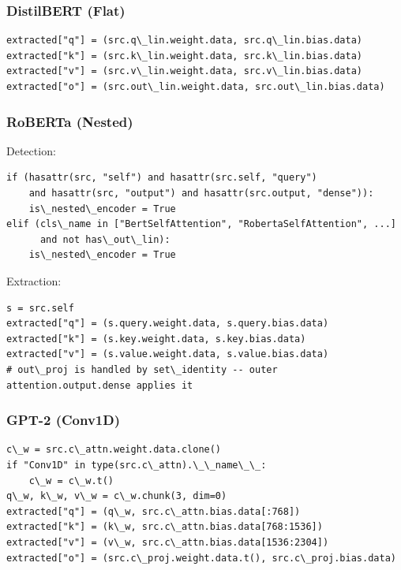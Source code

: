 \subsubsection{DistilBERT (Flat)}

\begin{lstlisting}
extracted["q"] = (src.q\_lin.weight.data, src.q\_lin.bias.data)
extracted["k"] = (src.k\_lin.weight.data, src.k\_lin.bias.data)
extracted["v"] = (src.v\_lin.weight.data, src.v\_lin.bias.data)
extracted["o"] = (src.out\_lin.weight.data, src.out\_lin.bias.data)
\end{lstlisting}

\subsubsection{RoBERTa (Nested)}

Detection:

\begin{lstlisting}
if (hasattr(src, "self") and hasattr(src.self, "query")
    and hasattr(src, "output") and hasattr(src.output, "dense")):
    is\_nested\_encoder = True
elif (cls\_name in ["BertSelfAttention", "RobertaSelfAttention", ...]
      and not has\_out\_lin):
    is\_nested\_encoder = True
\end{lstlisting}

Extraction:

\begin{lstlisting}
s = src.self
extracted["q"] = (s.query.weight.data, s.query.bias.data)
extracted["k"] = (s.key.weight.data, s.key.bias.data)
extracted["v"] = (s.value.weight.data, s.value.bias.data)
# out\_proj is handled by set\_identity -- outer attention.output.dense applies it
\end{lstlisting}

\subsubsection{GPT-2 (Conv1D)}

\begin{lstlisting}
c\_w = src.c\_attn.weight.data.clone()
if "Conv1D" in type(src.c\_attn).\_\_name\_\_:
    c\_w = c\_w.t()
q\_w, k\_w, v\_w = c\_w.chunk(3, dim=0)
extracted["q"] = (q\_w, src.c\_attn.bias.data[:768])
extracted["k"] = (k\_w, src.c\_attn.bias.data[768:1536])
extracted["v"] = (v\_w, src.c\_attn.bias.data[1536:2304])
extracted["o"] = (src.c\_proj.weight.data.t(), src.c\_proj.bias.data)
\end{lstlisting}

